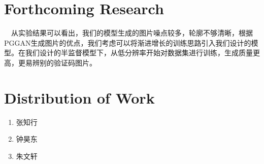 \documentclass[12pt]{article}
\newcounter{lastnote}
\newenvironment{scilastnote}{%
\setcounter{lastnote}{\value{enumiv}}%
\addtocounter{lastnote}{+1}%
\begin{list}%
{\arabic{lastnote}.}
{\setlength{\leftmargin}{.22in}}
{\setlength{\labelsep}{.5em}}}
{\end{list}}
\begin{document}
\section*{Forthcoming Research}

\ \ 从实验结果可以看出，我们的模型生成的图片噪点较多，轮廓不够清晰，根据PGGAN生成图片的优点，我们考虑可以将渐进增长的训练思路引入我们设计的模型。在我们设计的半监督模型下，从低分辨率开始对数据集进行训练，生成质量更高，更易辨别的验证码图片。


\section*{Distribution of Work}
\begin{enumerate}
	\item 张知行
	\item 钟昊东
	\item 朱文轩
\end{enumerate}

%

\printbibliography[title={References}]
%








\end{document}
